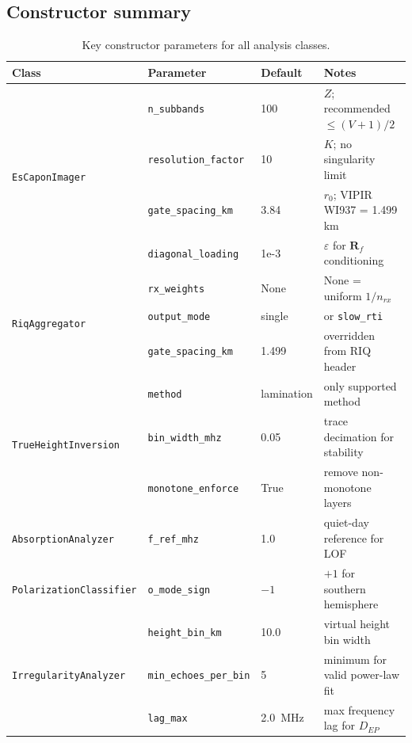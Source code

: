 \documentclass[a4paper,11pt]{article}
\newcommand{\Rf}{\mathbf{R}_f}
\begin{document}
\subsection{Constructor summary}

\begin{table}[H]
  \centering
  \caption{Key constructor parameters for all analysis classes.}
  \small
  \begin{tabular}{llll}
    \toprule
    Class & Parameter & Default & Notes \\
    \midrule
    \multirow{4}{*}{\texttt{EsCaponImager}}
      & \texttt{n\_subbands}        & 100     & $Z$; recommended $\le (V{+}1)/2$ \\
      & \texttt{resolution\_factor} & 10      & $K$; no singularity limit \\
      & \texttt{gate\_spacing\_km}  & 3.84    & $r_0$; VIPIR WI937 = 1.499 km \\
      & \texttt{diagonal\_loading}  & 1e-3    & $\varepsilon$ for $\Rf$ conditioning \\
    \midrule
    \multirow{3}{*}{\texttt{RiqAggregator}}
      & \texttt{rx\_weights}        & None    & None = uniform $1/n_{rx}$ \\
      & \texttt{output\_mode}       & single  & or \texttt{slow\_rti} \\
      & \texttt{gate\_spacing\_km}  & 1.499   & overridden from RIQ header \\
    \midrule
    \multirow{3}{*}{\texttt{TrueHeightInversion}}
      & \texttt{method}             & lamination & only supported method \\
      & \texttt{bin\_width\_mhz}    & 0.05    & trace decimation for stability \\
      & \texttt{monotone\_enforce}  & True    & remove non-monotone layers \\
    \midrule
    \texttt{AbsorptionAnalyzer}
      & \texttt{f\_ref\_mhz}        & 1.0     & quiet-day reference for LOF \\
    \midrule
    \texttt{PolarizationClassifier}
      & \texttt{o\_mode\_sign}      & $-1$    & $+1$ for southern hemisphere \\
    \midrule
    \multirow{3}{*}{\texttt{IrregularityAnalyzer}}
      & \texttt{height\_bin\_km}    & 10.0    & virtual height bin width \\
      & \texttt{min\_echoes\_per\_bin} & 5   & minimum for valid power-law fit \\
      & \texttt{lag\_max}           & 2.0~MHz & max frequency lag for $D_{EP}$ \\
    \bottomrule
  \end{tabular}
\end{table}
\end{document}
